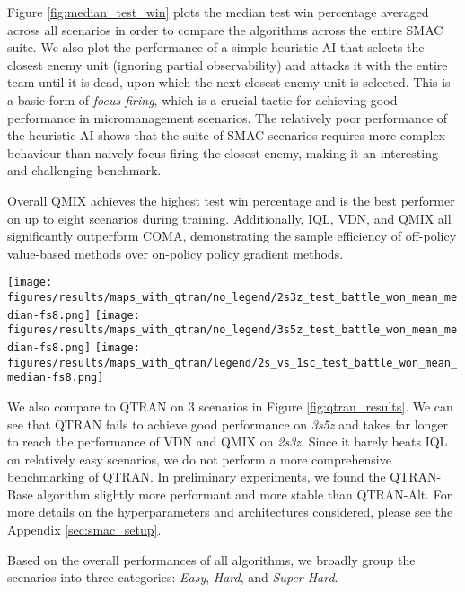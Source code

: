 \documentclass[twoside,11pt]{article}
\begin{document}
Figure \ref{fig:median_test_win} plots the median test win percentage averaged across all scenarios in order to compare the algorithms across the entire SMAC suite. 
We also plot the performance of a simple heuristic AI that selects the closest enemy unit (ignoring partial observability) and attacks it with the entire team until it is dead, upon which the next closest enemy unit is selected. This is a basic form of \textit{focus-firing}, which is a crucial tactic for achieving good performance in micromanagement scenarios.
The relatively poor performance of the heuristic AI shows that the suite of SMAC scenarios requires more complex behaviour than naively focus-firing the closest enemy, making it an interesting and challenging benchmark.

Overall QMIX achieves the highest test win percentage and is the best performer on up to eight scenarios during training. 
Additionally, IQL, VDN, and QMIX all significantly outperform COMA, demonstrating the sample efficiency of off-policy value-based methods over on-policy policy gradient methods. 

\begin{figure*}[h!]
	\centering
	\texttt{[image: figures/results/maps\_with\_qtran/no\_legend/2s3z\_test\_battle\_won\_mean\_median-fs8.png]}
	\texttt{[image: figures/results/maps\_with\_qtran/no\_legend/3s5z\_test\_battle\_won\_mean\_median-fs8.png]}
	\texttt{[image: figures/results/maps\_with\_qtran/legend/2s\_vs\_1sc\_test\_battle\_won\_mean\_median-fs8.png]}
	\caption{Three scenarios including QTRAN.}
	\label{fig:qtran_results}
\end{figure*}

We also compare to QTRAN on 3 scenarios in Figure \ref{fig:qtran_results}. 
We can see that QTRAN fails to achieve good performance on \textit{3s5z} and takes far longer to reach the performance of VDN and QMIX on \textit{2s3z}. 
Since it barely beats IQL on relatively easy scenarios, we do not perform a more comprehensive benchmarking of QTRAN.
In preliminary experiments, we found the QTRAN-Base algorithm slightly more performant and more stable than QTRAN-Alt. 
For more details on the hyperparameters and architectures considered, please see the Appendix \ref{sec:smac_setup}. 

Based on the overall performances of all algorithms, we broadly group the scenarios into three categories: 
\textit{Easy},
\textit{Hard}, and
\textit{Super-Hard}.
\end{document}
